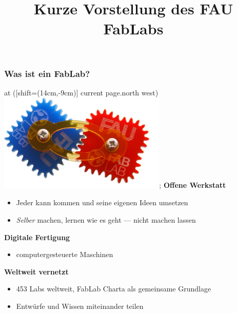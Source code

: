 \documentclass[t]{beamer}
\begin{document}


\date{}
\title[Vorstellung]{Kurze Vorstellung des FAU FabLabs}
\author{} %
\frame[plain,c]{\titlepage} %




\begin{frame}
	\frametitle{Was ist ein FabLab?}
  at ([shift={(14cm,-9cm)}] current page.north west) {\includegraphics[width=8cm]{img/zahnraeder.png}};%
\renewcommand{\baselinestretch}{1.5}
\textbf{Offene Werkstatt}
	\begin{itemize}
		\item Jeder kann kommen und seine eigenen Ideen umsetzen
		\item \emph{Selber} machen, lernen wie es geht --- nicht machen lassen
	\end{itemize}
\vspace{1.2em}

	\textbf{Digitale Fertigung}
\begin{itemize}
 \item computergesteuerte Maschinen
\end{itemize}




\vspace{1.2em}
	\textbf{Weltweit vernetzt}
	\begin{itemize}
		\item 453 Labs weltweit, FabLab Charta als gemeinsame Grundlage
		\item Entwürfe und Wissen miteinander teilen
	\end{itemize}
\end{frame}
\end{document}
